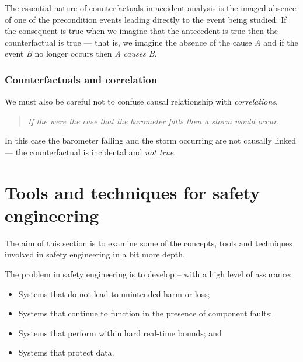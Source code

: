   The essential nature of counterfactuals in accident analysis is the
  imaged absence of one of the precondition events leading directly to
  the event being studied.
  If the consequent is true when we imagine that the antecedent is
  true then the counterfactual is true --- that is, we imagine the
  absence of the cause {\em A} and if the event {\em B} no longer
  occurs then {\em A causes B}.


  \subsubsection*{Counterfactuals and correlation}
  
  We must also be careful not to confuse causal relationship with {\em
    correlations}.

  \begin{quote}
    \emph{If the were the case that the barometer falls then a storm would occur.}
  \end{quote}

  In this case the barometer falling and the storm occurring are not
  causally linked --- the counterfactual is incidental and \emph{not
    true}.





  \section{Tools and techniques for safety engineering}

 The aim of this section is to examine some of the concepts, tools
  and techniques involved in safety engineering in a bit more depth. 


The problem in safety engineering is to develop -- with a high level of assurance:

\begin{itemize}

  \item Systems that do not lead to unintended harm or loss;

  \item Systems that continue to function in the presence of component
  faults;

  \item Systems that perform within hard real-time bounds; and 

  \item Systems that protect data.

\end{itemize}


